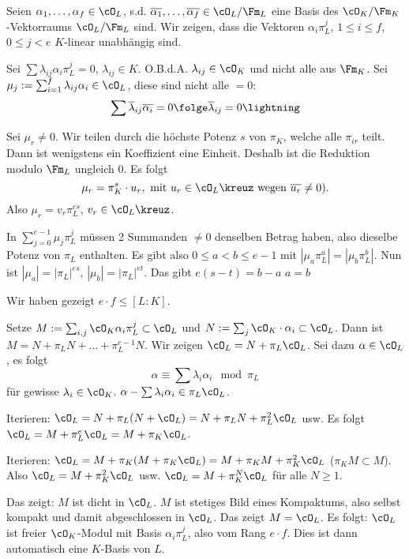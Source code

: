  \begin{Beweis}
  Seien $\alpha_1,\ldots,\alpha_f\in\cO_L$, s.d. $\overline{\alpha_1},\ldots,\overline{\alpha_f}\in\cO_L/\Fm_L$ eine Basis des $\cO_K/\Fm_K$-Vektorraums $\cO_L/\Fm_L$ sind. Wir zeigen, dass die Vektoren 
  $\alpha_i\pi_L^j$, $1\leq i\leq f$, $0\leq j<e$ $K$-linear unabhängig sind.
  
  Sei $\sum \lambda_{ij}\alpha_i\pi_L^j=0$, $\lambda_{ij}\in K$. O.B.d.A. $\lambda_{ij}\in\cO_K$ und nicht alle aus $\Fm_K$. Sei $\mu_j:=\sum_{i=1}^f\lambda_{ij}\alpha_i\in\cO_L$, diese sind nicht alle $=0$:
  \[ \sum \overline\lambda_{ij}\overline{\alpha_i}=0 \folge \overline\lambda_{ij}=0 \lightning\]
  
  Sei $\mu_r\neq 0$. Wir teilen durch die höchste Potenz $s$ von $\pi_K$, welche alle $\pi_{ir}$ teilt. Dann ist wenigstens ein Koeffizient eine Einheit. Deshalb ist die Reduktion modulo $\Fm_L$ ungleich $0$.
  Es folgt 
  \[ \mu_r=\pi_K^s\cdot u_r, \text{ mit } u_r\in\cO_L\kreuz \text{ wegen }\overline{u_r}\neq 0\text{)}.\]
  Also $\mu_r=v_r\pi_L^{es}$, $v_r\in\cO_L\kreuz$.
  
  In $\sum_{j=0}^{e-1}\mu_j\pi_L^j$ müssen 2 Summanden $\neq 0$ denselben Betrag haben, also dieselbe Potenz von $\pi_L$ enthalten. Es gibt also $0\leq a<b\leq e-1$ mit $|\mu_a\pi_L^a|=|\mu_b\pi_L^b|$. Nun ist 
  $|\mu_a|=|\pi_L|^{es}$, $|\mu_b|=|\pi_L|^{et}$. Das gibt $e(s-t)=b-a$ \folge $a=b$ \lightning
  
  Wir haben gezeigt $e\cdot f\leq [L:K]$.
  
  Setze $M:=\sum_{i,j}\cO_K \alpha_i\pi_L^j\subset \cO_L$ und $N:=\sum_{j}\cO_K\cdot \alpha_i\subset \cO_L$.
  Dann ist $M=N+\pi_LN+\ldots+\pi_L^{e-1}N$. Wir zeigen $\cO_L=N+\pi_L\cO_L$. Sei dazu $\alpha\in\cO_L$, es folgt 
  \[ \alpha\equiv \sum \lambda_i\alpha_i \mod{\pi_L}\]
  für gewisse $\lambda_i\in\cO_K$. \folge $\alpha-\sum\lambda_i\alpha_i\in\pi_L\cO_L$.
  
  Iterieren: $\cO_L=N+\pi_L(N+\cO_L)=N+\pi_LN+\pi_L^2\cO_L$ usw.
  Es folgt $\cO_L=M+\pi_L^e\cO_L=M+\pi_K\cO_L$.
  
  Iterieren: $\cO_L=M+\pi_K(M+\pi_K\cO_L)=M+\pi_KM+\pi_K^2\cO_L$ ($\pi_KM\subset M$). Also $\cO_L=M+\pi_K^2\cO_L$ usw. \folge $\cO_L=M+\pi_K^N\cO_L$ für alle $N\geq 1$.
  
  Das zeigt: $M$ ist dicht in $\cO_L$. $M$ ist stetiges Bild eines Kompaktums, also selbst kompakt und damit abgeschlossen in $\cO_L$. Das zeigt $M=\cO_L$.
  Es folgt: $\cO_L$ ist freier $\cO_K$-Modul mit Basis $\alpha_i\pi_L^j$, also vom Rang $e\cdot f$.
  Dies ist dann automatisch eine $K$-Basis von $L$.
 \end{Beweis}

